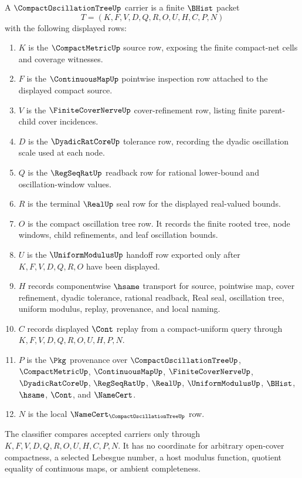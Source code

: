 \begin{definition}
\label{def:compact-oscillation-tree-carrier}
A $\CompactOscillationTreeUp$ carrier is a finite $\BHist$ packet
$$
T=(K,F,V,D,Q,R,O,U,H,C,P,N)
$$
with the following displayed rows:
\begin{enumerate}
\item $K$ is the $\CompactMetricUp$ source row, exposing the finite compact-net cells and coverage witnesses.
\item $F$ is the $\ContinuousMapUp$ pointwise inspection row attached to the displayed compact source.
\item $V$ is the $\FiniteCoverNerveUp$ cover-refinement row, listing finite parent-child cover incidences.
\item $D$ is the $\DyadicRatCoreUp$ tolerance row, recording the dyadic oscillation scale used at each node.
\item $Q$ is the $\RegSeqRatUp$ readback row for rational lower-bound and oscillation-window values.
\item $R$ is the terminal $\RealUp$ seal row for the displayed real-valued bounds.
\item $O$ is the compact oscillation tree row. It records the finite rooted tree, node windows, child refinements, and leaf oscillation bounds.
\item $U$ is the $\UniformModulusUp$ handoff row exported only after $K,F,V,D,Q,R,O$ have been displayed.
\item $H$ records componentwise $\hsame$ transport for source, pointwise map, cover refinement, dyadic tolerance, rational readback, Real seal, oscillation tree, uniform modulus, replay, provenance, and local naming.
\item $C$ records displayed $\Cont$ replay from a compact-uniform query through $K,F,V,D,Q,R,O,U,H,P,N$.
\item $P$ is the $\Pkg$ provenance over $\CompactOscillationTreeUp$, $\CompactMetricUp$, $\ContinuousMapUp$, $\FiniteCoverNerveUp$, $\DyadicRatCoreUp$, $\RegSeqRatUp$, $\RealUp$, $\UniformModulusUp$, $\BHist$, $\hsame$, $\Cont$, and $\NameCert$.
\item $N$ is the local $\NameCert_{\CompactOscillationTreeUp}$ row.
\end{enumerate}
The classifier compares accepted carriers only through $K,F,V,D,Q,R,O,U,H,C,P,N$. It has no coordinate for arbitrary open-cover compactness, a selected Lebesgue number, a host modulus function, quotient equality of continuous maps, or ambient completeness.
\end{definition}

